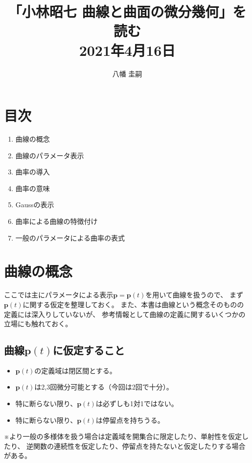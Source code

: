 \documentclass[a4j,disablejfam,dvipdfmx,papersize,slide,uplatex,21pt]{jsarticle}
\begin{document}
\title{「小林昭七 曲線と曲面の微分幾何」を読む\\
2021年4月16日}
\author{八幡 圭嗣}
\date{}
\maketitle

\section*{目次}
\begin{enumerate}
    \item 曲線の概念
    \item 曲線のパラメータ表示
    \item 曲率の導入
    \item 曲率の意味
    \item Gaussの表示
    \item 曲率による曲線の特徴付け
    \item 一般のパラメータによる曲率の表式
\end{enumerate}



\section{曲線の概念}
ここでは主にパラメータによる表示$\bm{p} = \bm{p}(t)$を用いて曲線を扱うので、
まず$\bm{p}(t)$に関する仮定を整理しておく。
また、本書は曲線という概念そのものの定義には深入りしていないが、
参考情報として曲線の定義に関するいくつかの立場にも触れておく。

\newpage
\subsection*{曲線$\bm{p}(t)$に仮定すること}
\begin{itemize}
    \item $\bm{p}(t)$の定義域は閉区間とする。
    \item $\bm{p}(t)$は2,3回微分可能とする（今回は2回で十分）。
    \item 特に断らない限り、$\bm{p}(t)$は必ずしも1対1ではない。
    \item 特に断らない限り、$\bm{p}(t)$は停留点を持ちうる。
\end{itemize}

\vspace{1em}
※より一般の多様体を扱う場合は定義域を開集合に限定したり、単射性を仮定したり、
逆関数の連続性を仮定したり、停留点を持たないと仮定したりする場合がある。
\end{document}
